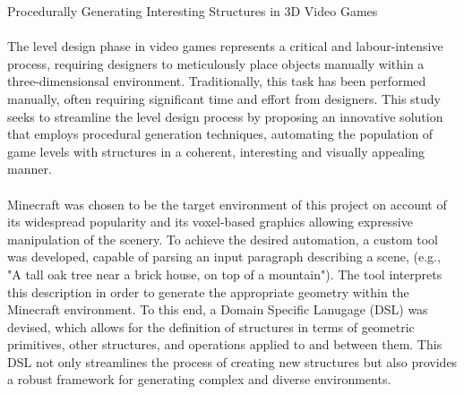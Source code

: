 \documentclass[11pt, a4paper]{article}
\begin{document}
\begin{flushleft}

Procedurally Generating Interesting Structures in 3D Video Games\linebreak


\paragraph*{}
The level design phase in video games represents a critical and labour-intensive process, requiring designers to meticulously place objects manually within a three-dimensionsal environment.
Traditionally, this task has been performed manually, often requiring significant time and effort from designers.
This study seeks to streamline the level design process by proposing an innovative solution that employs procedural generation techniques, automating the population of game levels with structures in a coherent, interesting and visually appealing manner.


\paragraph*{}
Minecraft was chosen to be the target environment of this project on account of its widespread popularity and its voxel-based graphics allowing expressive manipulation of the scenery.
To achieve the desired automation, a custom tool was developed, capable of parsing an input paragraph describing a scene, (e.g., "A tall oak tree near a brick house, on top of a mountain"). The tool interprets this description in order to generate the appropriate geometry within the Minecraft environment.
To this end, a Domain Specific Lanugage (DSL) was devised, which allows for the definition of structures in terms of geometric primitives, other structures, and operations applied to and between them.
This DSL not only streamlines the process of creating new structures but also provides a robust framework for generating complex and diverse environments.



\end{flushleft}
\end{document}
